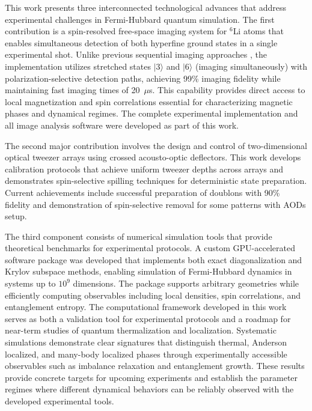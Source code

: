 
This work presents three interconnected technological advances that address experimental challenges in Fermi-Hubbard quantum simulation. The first contribution is a spin-resolved free-space imaging system for $^6$Li atoms that enables simultaneous detection of both hyperfine ground states in a single experimental shot. Unlike previous sequential imaging approaches \cite{bergschneider_spin-resolved_2018}, the implementation utilizes stretched states $|3\rangle$ and $|6\rangle$ (imaging simultaneously) with polarization-selective detection paths, achieving 99\% imaging fidelity while maintaining fast imaging times of 20~$\mu$s. This capability provides direct access to local magnetization and spin correlations essential for characterizing magnetic phases and dynamical regimes. The complete experimental implementation and all image analysis software were developed as part of this work.

The second major contribution involves the design and control of two-dimensional optical tweezer arrays using crossed acousto-optic deflectors. This work develops calibration protocols that achieve uniform tweezer depths across arrays and demonstrates spin-selective spilling techniques for deterministic state preparation. Current achievements include successful preparation of doublons with 90\% fidelity and demonstration of spin-selective removal for some patterns with AODs setup.

The third component consists of numerical simulation tools that provide theoretical benchmarks for experimental protocols. A custom GPU-accelerated software package was developed that implements both exact diagonalization and Krylov subspace methods, enabling simulation of Fermi-Hubbard dynamics in systems up to $10^9$ dimensions. The package supports arbitrary geometries while efficiently computing observables including local densities, spin correlations, and entanglement entropy.
The computational framework developed in this work serves as both a validation tool for experimental protocols and a roadmap for near-term studies of quantum thermalization and localization. Systematic simulations demonstrate clear signatures that distinguish thermal, Anderson localized, and many-body localized phases through experimentally accessible observables such as imbalance relaxation and entanglement growth. These results provide concrete targets for upcoming experiments and establish the parameter regimes where different dynamical behaviors can be reliably observed with the developed experimental tools.

